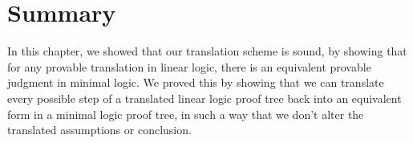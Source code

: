 \documentclass[../../../main.tex]{subfiles}
\begin{document}
\section{Summary}

In this chapter, we showed that our translation scheme is sound, by showing that for any provable translation in linear logic, there is an equivalent provable judgment in minimal logic. We proved this by showing that we can translate every possible step of a translated linear logic proof tree back into an equivalent form in a minimal logic proof tree, in such a way that we don't alter the translated assumptions or conclusion.
\end{document}
